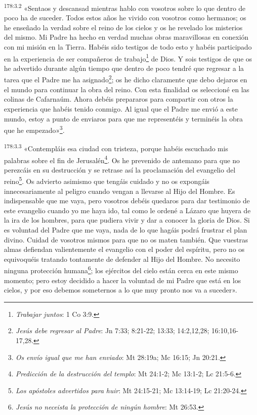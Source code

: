 \par
\textsuperscript{178:3.2} «Sentaos y descansad mientras hablo con vosotros sobre lo que dentro de poco ha de suceder. Todos estos años he vivido con vosotros como hermanos; os he enseñado la verdad sobre el reino de los cielos y os he revelado los misterios del mismo. Mi Padre ha hecho en verdad muchas obras maravillosas en conexión con mi misión en la Tierra. Habéis sido testigos de todo esto y habéis participado en la experiencia de ser compañeros de trabajo\footnote{\textit{Trabajar juntos}: 1 Co 3:9.} de Dios. Y sois testigos de que os he advertido durante algún tiempo que dentro de poco tendré que regresar a la tarea que el Padre me ha asignado\footnote{\textit{Jesús debe regresar al Padre}: Jn 7:33; 8:21-22; 13:33; 14:2,12,28; 16:10,16-17,28.}; os he dicho claramente que debo dejaros en el mundo para continuar la obra del reino. Con esta finalidad os seleccioné en las colinas de Cafarnaúm. Ahora debéis prepararos para compartir con otros la experiencia que habéis tenido conmigo. Al igual que el Padre me envió a este mundo, estoy a punto de enviaros para que me representéis y terminéis la obra que he empezado»\footnote{\textit{Os envío igual que me han enviado}: Mt 28:19a; Mc 16:15; Jn 20:21.}.

\par
\textsuperscript{178:3.3} «Contempláis esa ciudad con tristeza, porque habéis escuchado mis palabras sobre el fin de Jerusalén\footnote{\textit{Predicción de la destrucción del templo}: Mt 24:1-2; Mc 13:1-2; Lc 21:5-6.}. Os he prevenido de antemano para que no perezcáis en su destrucción y se retrase así la proclamación del evangelio del reino\footnote{\textit{Los apóstoles advertidos para huir}: Mt 24:15-21; Mc 13:14-19; Lc 21:20-24.}. Os advierto asimismo que tengáis cuidado y no os expongáis innecesariamente al peligro cuando vengan a llevarse al Hijo del Hombre. Es indispensable que me vaya, pero vosotros debéis quedaros para dar testimonio de este evangelio cuando yo me haya ido, tal como le ordené a Lázaro que huyera de la ira de los hombres, para que pudiera vivir y dar a conocer la gloria de Dios. Si es voluntad del Padre que me vaya, nada de lo que hagáis podrá frustrar el plan divino. Cuidad de vosotros mismos para que no os maten también. Que vuestras almas defiendan valientemente el evangelio con el poder del espíritu, pero no os equivoquéis tratando tontamente de defender al Hijo del Hombre. No necesito ninguna protección humana\footnote{\textit{Jesús no neceista la protección de ningún hombre}: Mt 26:53.}; los ejércitos del cielo están cerca en este mismo momento; pero estoy decidido a hacer la voluntad de mi Padre que está en los cielos, y por eso debemos someternos a lo que muy pronto nos va a suceder».

